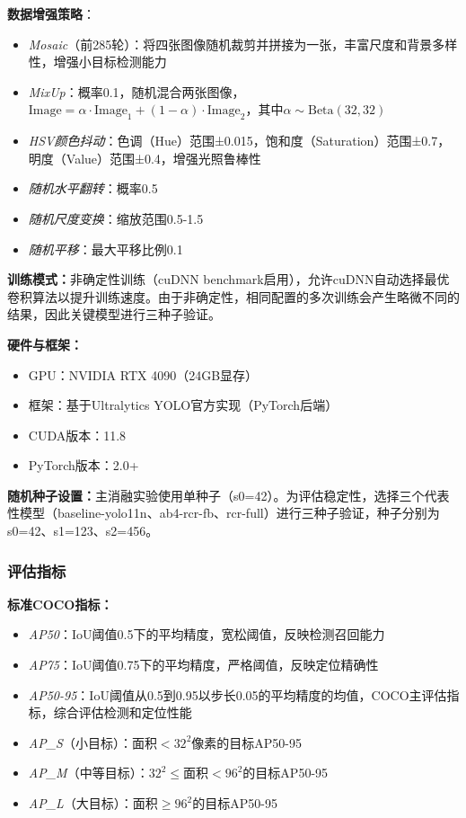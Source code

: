 \documentclass[journal]{IEEEtran}
\begin{document}
\textbf{数据增强策略}：
\begin{itemize}
    \item \textit{Mosaic}（前285轮）：将四张图像随机裁剪并拼接为一张，丰富尺度和背景多样性，增强小目标检测能力
    \item \textit{MixUp}：概率0.1，随机混合两张图像，$\text{Image} = \alpha \cdot \text{Image}_1 + (1-\alpha) \cdot \text{Image}_2$，其中$\alpha \sim \text{Beta}(32, 32)$
    \item \textit{HSV颜色抖动}：色调（Hue）范围±0.015，饱和度（Saturation）范围±0.7，明度（Value）范围±0.4，增强光照鲁棒性
    \item \textit{随机水平翻转}：概率0.5
    \item \textit{随机尺度变换}：缩放范围0.5-1.5
    \item \textit{随机平移}：最大平移比例0.1
\end{itemize}

\textbf{训练模式：}非确定性训练（cuDNN benchmark启用），允许cuDNN自动选择最优卷积算法以提升训练速度。由于非确定性，相同配置的多次训练会产生略微不同的结果，因此关键模型进行三种子验证。

\textbf{硬件与框架：}
\begin{itemize}
    \item GPU：NVIDIA RTX 4090（24GB显存）
    \item 框架：基于Ultralytics YOLO官方实现（PyTorch后端）
    \item CUDA版本：11.8
    \item PyTorch版本：2.0+
\end{itemize}

\textbf{随机种子设置：}主消融实验使用单种子（s0=42）。为评估稳定性，选择三个代表性模型（baseline-yolo11n、ab4-rcr-fb、rcr-full）进行三种子验证，种子分别为s0=42、s1=123、s2=456。

\subsubsection{评估指标}

\textbf{标准COCO指标：}
\begin{itemize}
    \item \textit{AP50}：IoU阈值0.5下的平均精度，宽松阈值，反映检测召回能力
    \item \textit{AP75}：IoU阈值0.75下的平均精度，严格阈值，反映定位精确性
    \item \textit{AP50-95}：IoU阈值从0.5到0.95以步长0.05的平均精度的均值，COCO主评估指标，综合评估检测和定位性能
    \item \textit{AP\_S}（小目标）：面积$< 32^2$像素的目标AP50-95
    \item \textit{AP\_M}（中等目标）：$32^2 \leq$面积$< 96^2$的目标AP50-95
    \item \textit{AP\_L}（大目标）：面积$\geq 96^2$的目标AP50-95
\end{itemize}
\end{document}
